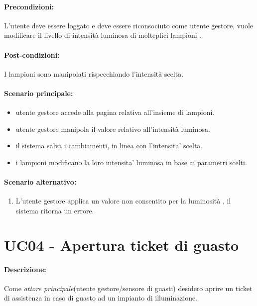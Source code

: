 \paragraph{Precondizioni:}
L'utente deve essere loggato e deve essere riconsociuto come utente gestore,
vuole modificare il livello di intensità luminosa di molteplici lampioni .


\paragraph{Post-condizioni:}
I lampioni sono manipolati rispecchiando l'intensità scelta.

\paragraph{Scenario principale:}
\begin{itemize}
    \item utente gestore accede alla pagina relativa all'insieme di lampioni.
    \item utente gestore manipola il valore relativo all'intensità luminosa.
    \item il sistema salva i cambiamenti, in linea con l'intensita' scelta.
    \item i lampioni modificano la loro intensita' luminosa in base ai parametri scelti.
\end{itemize}

\paragraph{Scenario alternativo:}
\begin{enumerate}
    \item L'utente gestore applica un valore non consentito per la luminosità , il sistema ritorna un errore.
\end{enumerate}


\section{UC04 - Apertura ticket di guasto}

\paragraph{Descrizione:}
Come \textit{attore principale}(utente gestore/sensore di guasti) desidero aprire un ticket di assistenza in caso di guasto ad un impianto di illuminazione.

